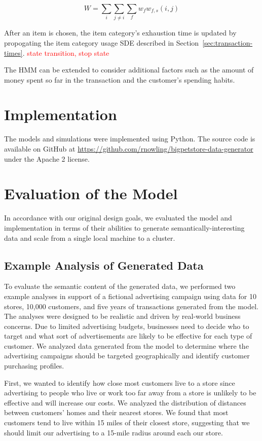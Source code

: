 \documentclass[conference]{IEEEtran}
\begin{document}
\begin{equation}
W = \sum_i \sum_{j \neq i} \sum_f w_f w_{f,s}(i, j)
\end{equation}

After an item is chosen, the item category's exhaustion time is updated by propogating the item category usage SDE described in Section~\ref{sec:transaction-times}. \textcolor{red}{state transition, stop state}

The HMM can be extended to consider additional factors such as the amount of money spent so far in the transaction and the customer's spending habits.

\section{Implementation}
The models and simulations were implemented using Python. The source code is available on GitHub \cite{GitHub} at \url{https://github.com/rnowling/bigpetstore-data-generator} under the Apache 2 license.

\section{Evaluation of the Model}
In accordance with our original design goals, we evaluated the model and implementation in terms of their abilities to generate semantically-interesting data and scale from a single local machine to a cluster.

\subsection{Example Analysis of Generated Data}
To evaluate the semantic content of the generated data, we performed two example analyses in support of a fictional advertising campaign using data for 10 stores, 10,000 customers, and five years of transactions generated from the model. The analyses were designed to be realistic and driven by real-world business concerns.  Due to limited advertising budgets, businesses need to decide who to target and what sort of advertisements are likely to be effective for each type of customer.  We analyzed data generated from the model to determine where the advertising campaigns should be targeted geographically and identify customer purchasing profiles.

First, we wanted to identify how close most customers live to a store since advertising to people who live or work too far away from a store is unlikely to be effective and will increase our costs. We analyzed the distribution of distances between customers' homes and their nearest stores.  We found that most customers tend to live within 15 miles of their closest store, suggesting that we should limit our advertising to a 15-mile radius around each our store.
\end{document}
